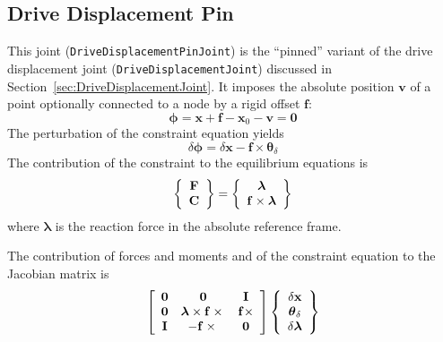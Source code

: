 \documentclass[10pt,dvips,fleqn,subeqn]{report}
\newcommand{\T}[1]{\bm{\mathbf{#1}}}
\begin{document}
\subsection{Drive Displacement Pin}
\label{sec:DriveDisplacementPinJoint}
This joint (\texttt{DriveDisplacementPinJoint}) is the ``pinned'' variant 
of the drive displacement joint (\texttt{DriveDisplacementJoint}) discussed
in Section~\ref{sec:DriveDisplacementJoint}.
It imposes the absolute position $\T{v}$ of a point
optionally connected to a node by a rigid offset $\T{f}$:
\begin{equation}
	\T{\phi} = \T{x} + \T{f} - \T{x}_0 - \T{v} = \T{0}
\end{equation}
The perturbation of the constraint equation yields
\begin{equation}
	\delta\T{\phi} = 
	\delta\T{x} - \T{f}\times \T{\theta}_{\delta}
\end{equation}
The contribution of the constraint to the equilibrium equations is
\begin{equation}
	\cubr{\cvvect{
		\T{F} \\
		\T{C}
	}} = \cubr{\cvvect{
		\T{\lambda} \\
		\T{f}\times \T{\lambda}
	}}
\end{equation}
where $\T{\lambda}$ is the reaction force in the absolute reference frame.

The contribution of forces and moments and of the constraint equation 
to the Jacobian matrix is
\begin{equation}
	\sqbr{\matr{ccc}{
		\T{0} &
			\T{0} &
			\T{I} \\
		\T{0} &
			\T{\lambda}\times\T{f}\times{} &
			\T{f}\times \\
		\T{I} &
			- \T{f}\times{} &
			\T{0}
	}}\cubr{\cvvect{
		\delta\T{x} \\
		\T{\theta}_{\delta} \\
		\delta\T{\lambda}
	}}
\end{equation}
\end{document}
